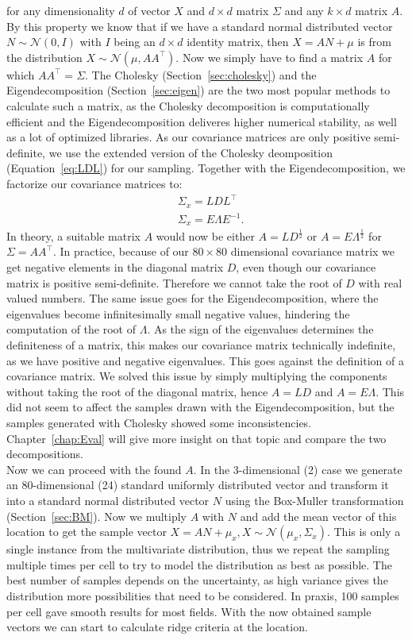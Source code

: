 \noindent for any dimensionality $d$ of vector $X$ and $d \times d$
matrix $\Sigma$ and any $k \times d$ matrix $A$. By this property we
know that if we have a standard normal distributed vector $N \sim
\mathcal{N}(0,I)$ with $I$ being an $d \times d$ identity matrix, then
$X = AN + \mu$ is from the distribution $X \sim \mathcal{N}(\mu, A
A^\top)$. Now we simply have to find a matrix $A$ for which $AA^\top =
\Sigma$. The Cholesky (Section~\ref{sec:cholesky}) and the
Eigendecomposition (Section~\ref{sec:eigen}) are the two most popular
methods to calculate such a matrix, as the Cholesky decomposition is
computationally efficient and the Eigendecomposition deliveres higher
numerical stability, as well as a lot of optimized libraries. As our
covariance matrices are only positive semi-definite, we use the
extended version of the Cholesky deomposition (Equation~\ref{eq:LDL})
for our sampling. Together with the Eigendecomposition, we factorize
our covariance matrices to:
\begin{align}
    &\Sigma_x = L D L^\top \\
    &\Sigma_x = E \Lambda E^{-1}.
\end{align}
In theory, a suitable matrix $A$ would now be either $A=L
D^{\frac{1}{2}}$ or $A=E\Lambda^{\frac{1}{2}}$ for $\Sigma = AA^\top$.
In practice, because of our $80 \times 80$ dimensional
covariance matrix we get negative elements in the diagonal matrix $D$,
even though our covariance matrix is positive semi-definite. Therefore
we cannot take the root of $D$ with real valued numbers. The same issue
goes for the Eigendecomposition, where the eigenvalues become
infinitesimally small negative values, hindering the computation of the
root of $\Lambda$. As the sign of the eigenvalues determines the
definiteness of a matrix, this makes our covariance matrix technically
indefinite, as we have positive and negative eigenvalues. This goes
against the definition of a covariance matrix. We solved this
issue by simply multiplying the components without taking the root of
the diagonal matrix, hence $A = LD$ and $A = E \Lambda$. This did not
seem to affect the samples drawn with the Eigendecomposition, but the
samples generated with Cholesky showed some inconsistencies.
Chapter~\ref{chap:Eval} will give more insight on that topic and compare
the two decompositions.\\
\indent Now we can proceed with the found $A$. In the
3-dimensional (2) case we generate an 80-dimensional (24) standard
uniformly distributed vector and transform it into a standard normal
distributed vector $N$ using the Box-Muller transformation
(Section~\ref{sec:BM}). Now we multiply $A$ with $N$ and add the mean
vector of this location to get the sample vector $X = AN + \mu_x, X \sim
\mathcal{N}(\mu_x, \Sigma_x)$. This is only a single instance from the
multivariate distribution, thus we repeat the sampling multiple times
per cell to try to model the distribution as best as possible. The best
number of samples depends on the uncertainty, as high variance gives the
distribution more possibilities that need to be considered. In praxis,
100 samples per cell gave smooth results for most fields. With the now
obtained sample vectors we can start to calculate ridge criteria at the
location.

